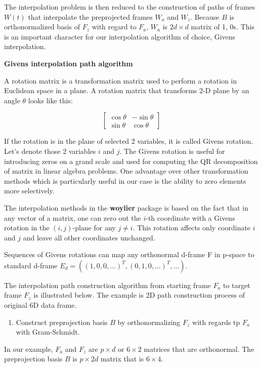 The interpolation problem is then reduced to the construction of paths of frames \(W(t)\) that interpolate the preprojected frames \(W_a\) and \(W_z\). Because \(B\) is orthonormalized basis of \(F_z\) with regard to \(F_a\), \(W_a\) is \(2d\times d\) matrix of 1, 0s. This is an important character for our interpolation algorithm of choice, Givens interpolation.

\textbf{Givens interpolation path algorithm}

A rotation matrix is a transformation matrix used to perform a rotation in Euclidean space in a plane. A rotation matrix that transforms 2-D plane by an angle \(\theta\) looks like this:

\[ \begin{bmatrix}\cos \theta &-\sin \theta \\\sin \theta &\cos \theta \end{bmatrix} \]

If the rotation is in the plane of selected 2 variables, it is called Givens rotation. Let's denote those 2 variables \(i\) and \(j\). The Givens rotation is useful for introducing zeros on a grand scale and used for computing the QR decomposition of matrix in linear algebra problems. One advantage over other transformation methods which is particularly useful in our case is the ability to zero elements more selectively.

The interpolation methods in the \textbf{woylier} package is based on the fact that in any vector of a matrix, one can zero out the \(i\)-th coordinate with a Givens rotation in the \((i, j)\)-plane for any \(j\neq i\). This rotation affects only coordinate \(i\) and \(j\) and leave all other coordinates unchanged.

Sequences of Givens rotations can map any orthonormal d-frame F in p-space to standard d-frame \(E_d=((1, 0, 0, ...)^T, (0, 1, 0, ...)^T, ...)\).

The interpolation path construction algorithm from starting frame \(F_a\) to target frame \(F_z\) is illustrated below. The example is 2D path construction process of original 6D data frame.

\begin{enumerate}
\def\labelenumi{\arabic{enumi}.}
\tightlist
\item
  Construct preprojection basis \(B\) by orthonormalizing \(F_z\) with regards tp \(F_a\) with Gram-Schmidt.
\end{enumerate}

In our example, \(F_a\) and \(F_z\) are \(p\times d\) or \(6\times2\) matrices that are orthonormal. The preprojection basis \(B\) is \(p\times 2d\) matrix that is \(6\times 4\).

